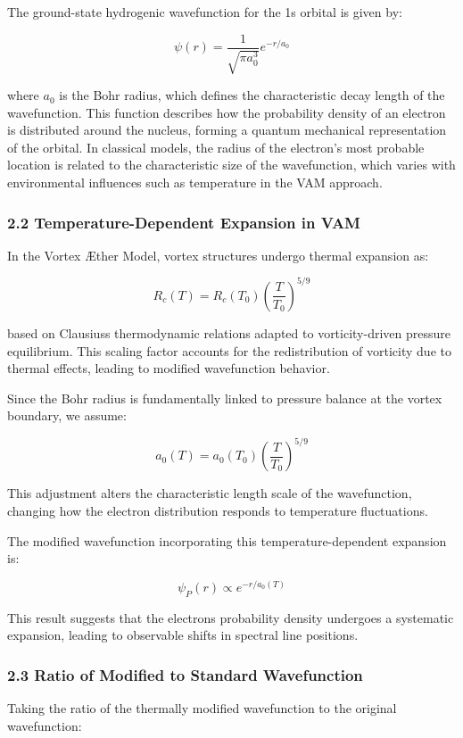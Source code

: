 The ground-state hydrogenic wavefunction for the 1s orbital is given by:

\[ \psi(r) = \frac{1}{\sqrt{\pi a_0^3}} e^{-r/a_0} \]

where \( a_0 \) is the Bohr radius, which defines the characteristic decay length of the wavefunction. This function describes how the probability density of an electron is distributed around the nucleus, forming a quantum mechanical representation of the orbital. In classical models, the radius of the electron's most probable location is related to the characteristic size of the wavefunction, which varies with environmental influences such as temperature in the VAM approach.

\subsubsection*{2.2 Temperature-Dependent Expansion in VAM}

In the Vortex Æther Model, vortex structures undergo thermal expansion as:

\[ R_c(T) = R_c (T_0) \left( \frac{T}{T_0} \right)^{5/9} \]

based on Clausius\rqs s thermodynamic relations adapted to vorticity-driven pressure equilibrium. This scaling factor accounts for the redistribution of vorticity due to thermal effects, leading to modified wavefunction behavior.

Since the Bohr radius is fundamentally linked to pressure balance at the vortex boundary, we assume:

\[ a_0(T) = a_0 (T_0) \left( \frac{T}{T_0} \right)^{5/9} \]

This adjustment alters the characteristic length scale of the wavefunction, changing how the electron distribution responds to temperature fluctuations.

The modified wavefunction incorporating this temperature-dependent expansion is:

\[ \psi_P(r) \propto e^{-r/a_0(T)} \]

This result suggests that the electron\rqs s probability density undergoes a systematic expansion, leading to observable shifts in spectral line positions.


\subsubsection*{2.3 Ratio of Modified to Standard Wavefunction}

Taking the ratio of the thermally modified wavefunction to the original wavefunction:

